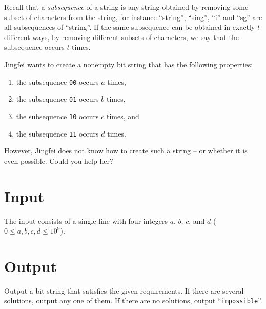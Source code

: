
%
\noindent
Recall that a \emph{subsequence} of a string is any string obtained by removing some subset of characters from the string, for instance ``string'', ``sing'', ``i'' and ``sg'' are all subsequences of ``string''.  If the same subsequence can be obtained in exactly $t$ different ways, by removing different subsets of characters, we say that the subsequence occurs $t$ times.

Jingfei wants to create a nonempty bit string that has the following properties:
\begin{enumerate}
\setlength{\itemsep}{0pt}
\item the subsequence \texttt{00} occurs $a$ times,
\item the subsequence \texttt{01} occurs $b$ times,
\item the subsequence \texttt{10} occurs $c$ times, and
\item the subsequence \texttt{11} occurs $d$ times.
\end{enumerate}
However, Jingfei does not know how to create such a string -- or whether it is even possible. Could you help her?

\section*{Input}

The input consists of a single line with four integers $a$, $b$, $c$, and
$d$ ($0 \leq a,b,c,d \leq 10^9$).

\section*{Output}

Output a bit string that satisfies the given requirements. If there are several solutions, output any one of them. If there are no solutions, output ``\texttt{impossible}''.
